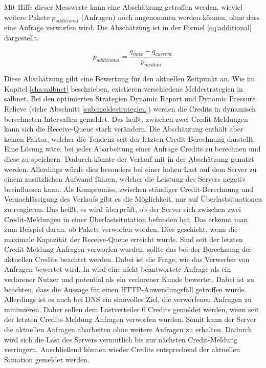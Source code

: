 \documentclass[a4paper, 12pt, BCOR10mm, DIV12, toc=bibliography, toc=listof, german]{scrbook}
\begin{document}
		Mit Hilfe dieser Messwerte kann eine Abschätzung getroffen werden, wieviel weitere Pakete
		$p_{additional}$ (Anfragen) noch angenommen werden können, ohne dass eine Anfrage verworfen wird.
		Die Abschätzung ist in der Formel \ref{eq:additional} dargestellt.

		\begin{equation}
			p_{additional} = \frac{q_{max} - q_{current}}{p_{median}}
			\label{eq:additional}
		\end{equation}

		Diese Abschätzung gibt eine Bewertung für den aktuellen Zeitpunkt an. Wie im Kapitel
		\ref{cha:salbnet} beschrieben, existieren verschiedene Meldestrategien in salbnet. Bei den
		optimierten Strategien Dynamic Report und Dynamic Pressure Relieve (siehe Abschnitt
		\ref{sub:meldestrategien}) werden die Credits in dynamisch berechneten Intervallen gemeldet. Das
		heißt, zwischen zwei Credit-Meldungen kann sich die Receive-Queue stark verändern. Die
		Abschätzung enthält aber keinen Faktor, welcher die Tendenz seit der letzten Credit-Berechnung
		darstellt. Eine Lösung wäre, bei jeder Abarbeitung einer Anfrage Credits zu berechnen und diese
		zu speichern. Dadurch könnte der Verlauf mit in der Abschätzung genutzt werden. Allerdings würde
		dies besonders bei einer hohen Last auf dem Server zu einem zusätzlichen Aufwand führen, welcher
		die Leistung des Servers negativ beeinflussen kann. Als Kompromiss, zwischen ständiger
		Credit-Berechnung und Vernachlässigung des Verlaufs gibt es die Möglichkeit, nur auf
		Überlastsituationen zu reagieren. Das heißt, es wird überprüft, ob der Server sich zwischen zwei
		Credit-Meldungen in einer Überlastsitutation befunden hat. Das erkennt man zum Beispiel daran,
		ob Pakete verworfen worden. Dies geschieht, wenn die maximale Kapazität der Receive-Queue
		erreicht wurde. Sind seit der letzten Credit-Meldung Anfragen verworfen wurden, sollte das bei
		der Berechnung der aktuellen Credits beachtet werden.  Dabei ist die Frage, wie das Verwerfen
		von Anfragen bewertet wird. In \cite{scsczile2008} wird eine nicht beantwortete Anfrage als ein
		verlorener Nutzer und potential als ein verlorener Kunde bewertet. Dabei ist zu beachten, dass
		die Aussage für einen HTTP-Anwendungsfall getroffen wurde.  Allerdings ist es auch bei DNS ein
		sinnvolles Ziel, die verworfenen Anfragen zu minimieren. Daher sollen dem Lastverteiler 0 Credits
		gemeldet werden, wenn seit der letzten Credits-Meldung Anfragen verworfen wurden. Somit kann der
		Server die aktuellen Anfragen abarbeiten ohne weitere Anfragen zu erhalten. Dadurch wird sich
		die Last des Servers vermutlich bis zur nächsten Credit-Meldung verringern. Anschließend können
		wieder Credits entsprechend der aktuellen Situation gemeldet werden.
\end{document}
